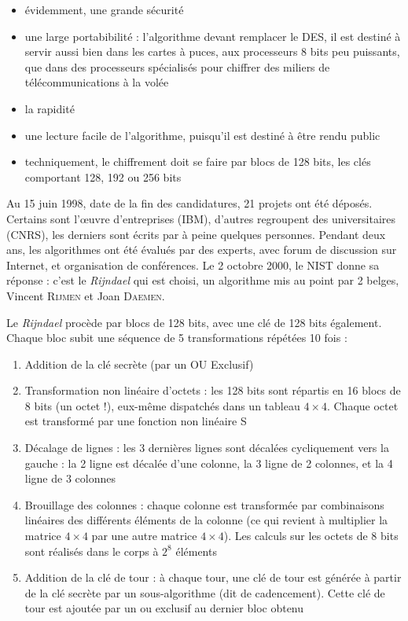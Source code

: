 \documentclass[a4paper,12pt]{article}
\begin{document}
\begin{itemize}
\item évidemment, une grande sécurité
\item une large portabibilité : l'algorithme devant remplacer le DES, il est destiné à servir aussi bien dans les cartes à puces, aux processeurs 8 bits peu puissants, que dans des processeurs spécialisés pour chiffrer des miliers de télécommunications à la volée
\item la rapidité
\item une lecture facile de l'algorithme, puisqu'il est destiné à être rendu public
\item techniquement, le chiffrement doit se faire par blocs de 128 bits, les clés comportant 128, 192 ou 256 bits
\end{itemize}

Au 15 juin 1998, date de la fin des candidatures, 21 projets ont été déposés. Certains sont l'\oe{}uvre d'entreprises (IBM), d'autres regroupent des universitaires (CNRS), les derniers sont écrits par à peine quelques personnes. Pendant deux ans, les algorithmes ont été évalués par des experts, avec forum de discussion sur Internet, et organisation de conférences. Le 2 octobre 2000, le NIST donne sa réponse : c'est le \emph{Rijndael} qui est choisi, un algorithme mis au point par 2 belges, Vincent \textsc{Rijmen} et Joan \textsc{Daemen}.

Le \emph{Rijndael} procède par blocs de 128 bits, avec une clé de 128 bits également. Chaque bloc subit une séquence de 5 transformations répétées 10 fois :

\begin{enumerate}
\item Addition de la clé secrète (par un OU Exclusif)
\item Transformation non linéaire d'octets : les 128 bits sont répartis en 16 blocs de 8 bits (un octet !), eux-même dispatchés dans un tableau $4 \times 4$. Chaque octet est transformé par une fonction non linéaire S
\item Décalage de lignes : les 3 dernières lignes sont décalées cycliquement vers la gauche : la 2\ieme{} ligne est décalée d'une colonne, la 3\ieme{} ligne de 2 colonnes, et la 4\ieme{} ligne de 3 colonnes
\item Brouillage des colonnes : chaque colonne est transformée par combinaisons linéaires des différents éléments de la colonne (ce qui revient à multiplier la matrice $4 \times 4$ par une autre matrice $4 \times 4$). Les calculs sur les octets de 8 bits sont réalisés dans le corps à $2^{8}$ éléments
\item Addition de la clé de tour : à chaque tour, une clé de tour est générée à partir de la clé secrète par un sous-algorithme (dit de cadencement). Cette clé de tour est ajoutée par un ou exclusif au dernier bloc obtenu
\end{enumerate}
\end{document}
